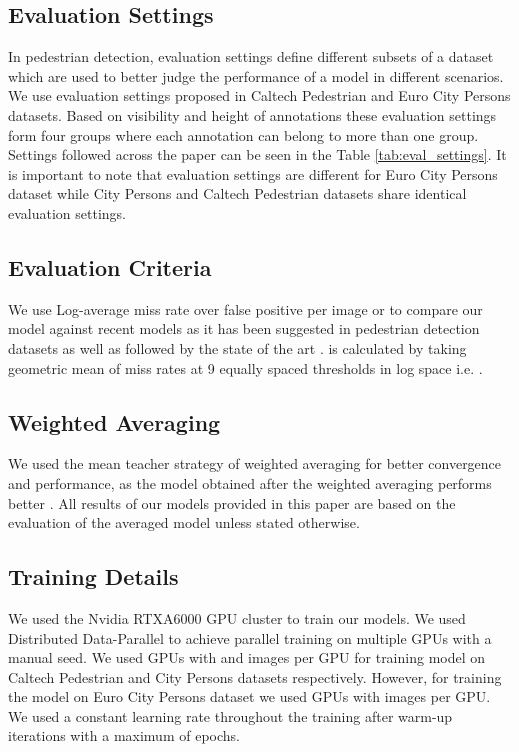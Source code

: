 \documentclass[a4paper,conference]{IEEEtran}
\begin{document}
\subsection{Evaluation Settings}
In pedestrian detection, evaluation settings define different subsets of a dataset which are used to better judge the performance of a model in different scenarios. We use evaluation settings proposed in Caltech Pedestrian \cite{caltech} and Euro City Persons \cite{eurocitypersons} datasets. Based on visibility and height of annotations these evaluation settings form four groups where each annotation can belong to more than one group. Settings followed across the paper can be seen in the Table \ref{tab:eval_settings}. It is important to note that evaluation settings are different for Euro City Persons dataset \cite{eurocitypersons} while City Persons \cite{citypersons} and Caltech Pedestrian datasets \cite{caltech} share identical evaluation settings.

\subsection{Evaluation Criteria}
We use Log-average miss rate over false positive per image or  to compare our model against recent models as it has been suggested in pedestrian detection datasets \cite{citypersons, caltech, eurocitypersons} as well as followed by the state of the art \cite{pedestron, bgcnet, betarcnn, csp}.  is calculated by taking geometric mean of miss rates at 9 equally spaced  thresholds in log space i.e. .

\subsection{Weighted Averaging}
We used the mean teacher strategy of weighted averaging for better convergence and performance, as the model obtained after the weighted averaging performs better \cite{mean_teacher, csp}. All results of our models provided in this paper are based on the evaluation of the averaged model unless stated otherwise.

\subsection{Training Details}
We used the Nvidia RTXA6000 GPU cluster to train our models. We used Distributed Data-Parallel to achieve parallel training on multiple GPUs with a manual seed. We used  GPUs with  and  images per GPU for training model on Caltech Pedestrian \cite{caltech} and City Persons \cite{citypersons} datasets respectively. However, for training the model on Euro City Persons dataset \cite{eurocitypersons} we used  GPUs with  images per GPU. We used a constant learning rate throughout the training after warm-up iterations with a maximum of  epochs. 

\end{document}
